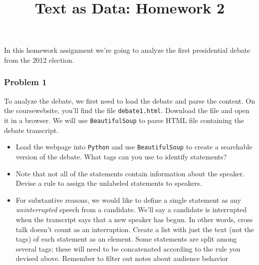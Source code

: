 \documentclass[12pt,letterpaper]{article}
\title{Text as Data: Homework 2}
\date{}
\begin{document}
\maketitle


In this homework assignment we're going to analyze the first presidential debate from the 2012 election.  \\

\subsubsection*{Problem 1}
To analyze the debate, we first need to load the debate and parse the content.  On the coursewebsite, you'll find the file {\tt debate1.html}.  Download the file and open it in a browser. We will use {\tt BeautifulSoup} to parse HTML file containing the debate transcript.

\begin{itemize}
\item Load the webpage into {\tt Python} and use {\tt BeautifulSoup} to create a searchable version of the debate. What tags can you use to identify statements?

\item Note that not all of the statements contain information about the speaker. Devise a rule to assign the unlabeled statements to speakers.

\item For substantive reasons, we would like to define a single statement as any \textit{uninterrupted} speech from a candidate. We'll say a candidate is interrupted when the transcript says that a new speaker has begun.  In other words, cross talk doesn't count as an interruption. Create a list with just the text (not the tags) of each statement as an element. Some statements are split among several tags; these will need to be concatenated according to the rule you devised above. Remember to filter out notes about audience behavior

\end{itemize}
\end{document}
